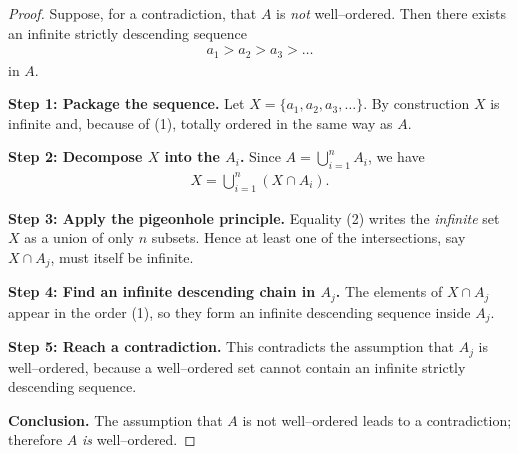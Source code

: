 \documentclass[12pt]{article}
\theoremstyle{definition} %
\theoremstyle{plain} %
\begin{document}
\begin{proof}
  Suppose, for a contradiction, that $A$ is \emph{not} well--ordered.  
  Then there exists an infinite strictly descending sequence
  \begin{align}
      a_1>a_2>a_3>\dots \tag{1}
  \end{align}
  in $A$.

  \medskip
  \noindent\textbf{Step 1:  Package the sequence.}  
  Let $X=\{a_1,a_2,a_3,\dots\}$.  
  By construction $X$ is infinite and, because of (1), totally ordered in the same way as $A$.

  \medskip
  \noindent\textbf{Step 2:  Decompose $X$ into the $A_i$.}  
  Since $A=\bigcup_{i=1}^n A_i$, we have
  \begin{align}
      X=\bigcup_{i=1}^n (X\cap A_i). \tag{2}
  \end{align}

  \medskip
  \noindent\textbf{Step 3:  Apply the pigeonhole principle.}  
  Equality (2) writes the \emph{infinite} set $X$ as a union of only $n$ subsets.  
  Hence at least one of the intersections, say $X\cap A_j$, must itself be infinite.

  \medskip
  \noindent\textbf{Step 4:  Find an infinite descending chain in $A_j$.}  
  The elements of $X\cap A_j$ appear in the order (1), so they form an infinite descending sequence inside $A_j$.

  \medskip
  \noindent\textbf{Step 5:  Reach a contradiction.}  
  This contradicts the assumption that $A_j$ is well--ordered, because a well--ordered set cannot contain an infinite strictly descending sequence.

  \medskip
  \noindent\textbf{Conclusion.}  
  The assumption that $A$ is not well--ordered leads to a contradiction; therefore $A$ \emph{is} well--ordered.
\end{proof}
\end{document}

